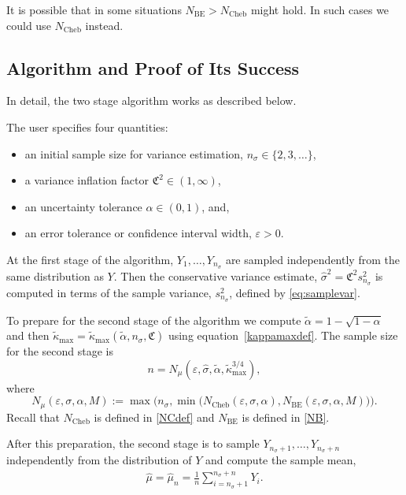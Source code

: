 \documentclass[graybox]{svmult}
\newcommand{\fudge}{\mathfrak{C}}
\newcommand{\hmu}{\hat{\mu}}
\newcommand{\hsigma}{\hat{\sigma}}
\begin{document}
It is possible that in some situations
$N_{\text{BE}}>N_{\text{Cheb}}$ might
hold. In such cases we could use $N_{\text{Cheb}}$
instead.

\subsection{Algorithm and Proof of Its Success}

In detail, the two stage algorithm works
as described below.


\begin{algo} \label{twostagealgo} The user specifies
four quantities:
\begin{itemize}
\item 
an initial sample size for variance estimation, $n_\sigma \in \{2,3, \ldots\}$,
\item
a variance inflation factor $\fudge^2\in(1,\infty)$,
\item
an uncertainty tolerance $\alpha\in(0,1)$, and,
\item
an error tolerance or confidence interval width, $\varepsilon>0$.
\end{itemize}

At the first stage of the algorithm,
$Y_1,\dots,Y_{n_\sigma}$ are sampled independently
from the same distribution as $Y$.
Then the conservative variance estimate, $\hat\sigma^2 = \fudge^2 s^2_{n_\sigma}$
is computed in terms of the sample variance, $s^2_{n_\sigma}$, defined by \eqref{eq:samplevar}.

To prepare for the second stage of the algorithm
we compute $\tilde\alpha = 1-\sqrt{1-\alpha}$
and then $\tilde\kappa_{\max} = \tilde\kappa_{\max}(\tilde\alpha,n_\sigma,\fudge)$
using equation~\eqref{kappamaxdef}.
The sample size for the second stage is
\[
n = N_{\mu}(\varepsilon,\hsigma,\tilde\alpha,\tilde\kappa_{\max}^{3/4}),
\]
where
\begin{equation} \label{NCBdef}
N_{\mu}(\varepsilon,\sigma,\alpha,M) 
:= \max\bigl( n_{\sigma}, \min\bigl(N_{\text{Cheb}}(\varepsilon,\sigma,\alpha), 
N_{\text{BE}}(\varepsilon,\sigma,\alpha,M) \bigr) \bigr).
\end{equation} 
Recall that
$N_{\text{Cheb}}$ is defined in \eqref{NCdef} and  $N_{\text{BE}}$ 
is defined in \eqref{NB}.  

After this preparation, the second stage is to sample
$Y_{n_\sigma+1},\dots,Y_{n_\sigma+n}$ independently
from the distribution of $Y$ and compute the sample mean,
\begin{align}\label{eq:theestimate}
\hmu=\hat\mu_n = \frac1{n}\sum_{i=n_\sigma+1}^{n_\sigma+n}Y_i.
\end{align}

\end{algo}
\end{document}

